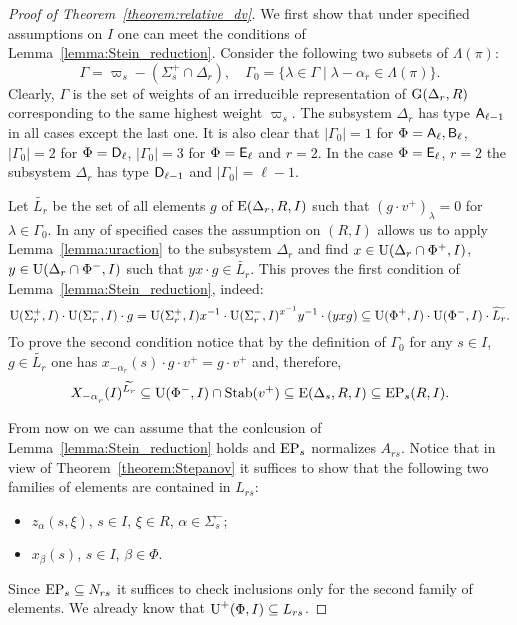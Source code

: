 \begin{proof}[Proof of Theorem~\ref{theorem:relative_dv}]
We first show that under specified assumptions on $I$ one can meet the conditions of Lemma~\ref{lemma:Stein_reduction}.
Consider the following two subsets of $\Lambda(\pi)$:
$$\Gamma = \varpi_s- (\Sigma_s^+\cap \Delta_r),\quad \Gamma_0 = \{\lambda \in \Gamma \mid \lambda - \alpha_r \in \Lambda(\pi) \}.$$
Clearly, $\Gamma$ is the set of weights of an irreducible representation of $\operatorname{G}(\Delta_r, R)$ corresponding to the same highest weight $\varpi_s$.
The subsystem $\Delta_r$ has type $\mathsf{A}_{\ell-1}$ in all cases except the last one.
It is also clear that $|\Gamma_0|=1$ for $\Phi=\mathsf{A}_\ell, \mathsf{B}_\ell$, $|\Gamma_0|=2$ for $\Phi=\mathsf{D}_\ell$, $|\Gamma_0|=3$ for $\Phi=\mathsf{E}_\ell$ and $r=2$.
In the case $\Phi=\mathsf{E}_\ell$, $r=2$ the subsystem $\Delta_r$ has type $\mathsf{D}_{\ell-1}$ and $|\Gamma_0|=\ell-1$.

Let $\widetilde{L_r}$ be the set of all elements $g$ of $\operatorname{E}(\Delta_r,R, I)$ such that $(g \cdot v^+)_\lambda = 0$ for $\lambda\in\Gamma_0$.
In any of specified cases the assumption on $(R, I)$ allows us to apply Lemma~\ref{lemma:uraction} to the subsystem $\Delta_r$ and find
$x\in\operatorname{U}(\Delta_r\cap\Phi^+, I)$, $y\in \operatorname{U}(\Delta_r\cap\Phi^-, I)$ such that $yx\cdot g \in \widetilde{L_r}$.
This proves the first condition of Lemma~\ref{lemma:Stein_reduction}, indeed:
$$ \operatorname{U}(\Sigma^+_r, I)\cdot \operatorname{U}(\Sigma^-_r, I) \cdot g = \operatorname{U}(\Sigma^+_r, I) x^{-1} \cdot \operatorname{U}(\Sigma^-_r, I)^{x^{-1}} y^{-1} \cdot (yxg) \subseteq \operatorname{U}(\Phi^+, I)\cdot \operatorname{U}(\Phi^-, I) \cdot \widetilde{L_r}.$$
To prove the second condition notice that by the definition of $\Gamma_0$ for any $s\in I$, $ g\in\widetilde{L_r}$ one has $x_{-\alpha_r}(s) \cdot g \cdot v^+ = g \cdot v^+$ and, therefore,
$$X_{-\alpha\ssub{r}}(I)^{\widetilde{L_r}} \subseteq \U(\Phi^-, I) \cap \Stab(v^+) \subseteq \E(\Delta_s, R, I) \subseteq \EP_s(R, I).$$

From now on we can assume that the conlcusion of Lemma~\ref{lemma:Stein_reduction} holds and $\operatorname{EP}_s$ normalizes $A_{rs}$.
Notice that in view of Theorem~\ref{theorem:Stepanov} it suffices to show that the following two families of elements are contained in $L_{rs}$:
\begin{itemize} \item $z_{\alpha}(s, \xi)$, $s\in I$, $\xi \in R$, $\alpha\in\Sigma^-_s$;
\item $x_{\beta}(s)$, $s \in I$, $\beta \in \Phi$. \end{itemize}
Since $\operatorname{EP}_s \subseteq N_{rs}$ it suffices to check inclusions only for the second family of elements.
We already know that $\operatorname{U}^+(\Phi, I) \subseteq L_{rs}$.


\end{proof}
